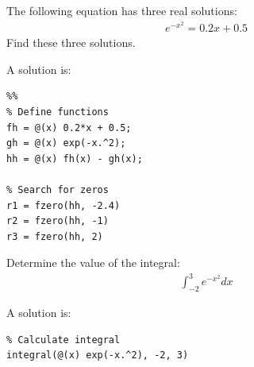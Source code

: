 \begin{ex}
The following equation has three real solutions:
\begin{align*}
e^{-x^2} = 0.2x + 0.5
\end{align*}
Find these three solutions.
\begin{hint}
\end{hint}
\begin{sol}
A solution is:
\begin{lstlisting}
%%
% Define functions
fh = @(x) 0.2*x + 0.5;
gh = @(x) exp(-x.^2);
hh = @(x) fh(x) - gh(x);

% Search for zeros
r1 = fzero(hh, -2.4)
r2 = fzero(hh, -1)
r3 = fzero(hh, 2)
\end{lstlisting}
\end{sol}
\end{ex}


\begin{ex}
Determine the value of the integral:
\begin{align*}
\int_{-2}^{3} e^{-x^2} dx
\end{align*}
\begin{hint}
\end{hint}
\begin{sol}
A solution is:
\begin{lstlisting}
% Calculate integral
integral(@(x) exp(-x.^2), -2, 3)
\end{lstlisting}
\end{sol}
\end{ex}


